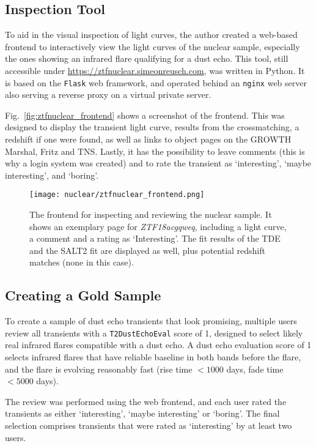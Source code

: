 \subsection{Inspection Tool}
To aid in the visual inspection of light curves, the author created a web-based frontend to interactively view the light curves of the nuclear sample, especially the ones showing an infrared flare qualifying for a dust echo. This tool, still accessible under \url{https://ztfnuclear.simeonreusch.com}, was written in Python. It is based on the \texttt{Flask} web framework, and operated behind an \texttt{nginx} web server also serving a reverse proxy on a virtual private server.

Fig.~\ref{fig:ztfnuclear_frontend} shows a screenshot of the frontend. This was designed to display the transient light curve, results from the crossmatching, a redshift if one were found, as well as links to object pages on the GROWTH Marshal, Fritz and TNS. Lastly, it has the possibility to leave comments (this is why a login system was created) and to rate the transient as `interesting', `maybe interesting', and `boring'.

\begin{figure}[htpb]
  \texttt{[image: nuclear/ztfnuclear\_frontend.png]}
  \caption[Frontend for the nuclear sample]{The frontend for inspecting and reviewing the nuclear sample. It shows an exemplary page for \textit{ZTF18acgqweq}, including a light curve, a comment and a rating as `Interesting'. The fit results of the TDE and the SALT2 fit are displayed as well, plus potential redshift matches (none in this case).}
\end{figure}

\subsection{Creating a Gold Sample}
To create a sample of dust echo transients that look promising, multiple users review all transients with a \texttt{T2DustEchoEval} score of 1, designed to select likely real infrared flares compatible with a dust echo. A dust echo evaluation score of 1 selects infrared flares that have reliable baseline in both bands before the flare, and the flare is evolving reasonably fast (rise time $<1000$ days, fade time $<5000$ days).

The review was performed using the web frontend, and each user rated the transients as either `interesting', `maybe interesting' or `boring'. The final selection comprises transients that were rated as `interesting' by at least two users.

